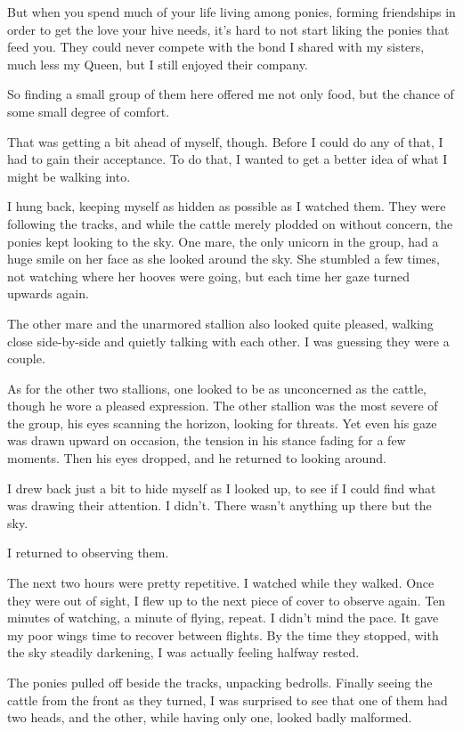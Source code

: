 But when you spend much of your life living among ponies, forming friendships in order to get the love your hive needs, it’s hard to not start liking the ponies that feed you. They could never compete with the bond I shared with my sisters, much less my Queen, but I still enjoyed their company.

So finding a small group of them here offered me not only food, but the chance of some small degree of comfort.

That was getting a bit ahead of myself, though. Before I could do any of that, I had to gain their acceptance. To do that, I wanted to get a better idea of what I might be walking into.

I hung back, keeping myself as hidden as possible as I watched them. They were following the tracks, and while the cattle merely plodded on without concern, the ponies kept looking to the sky. One mare, the only unicorn in the group, had a huge smile on her face as she looked around the sky. She stumbled a few times, not watching where her hooves were going, but each time her gaze turned upwards again.

The other mare and the unarmored stallion also looked quite pleased, walking close side-by-side and quietly talking with each other. I was guessing they were a couple.

As for the other two stallions, one looked to be as unconcerned as the cattle, though he wore a pleased expression. The other stallion was the most severe of the group, his eyes scanning the horizon, looking for threats. Yet even his gaze was drawn upward on occasion, the tension in his stance fading for a few moments. Then his eyes dropped, and he returned to looking around.

I drew back just a bit to hide myself as I looked up, to see if I could find what was drawing their attention. I didn’t. There wasn’t anything up there but the sky.

I returned to observing them.

The next two hours were pretty repetitive. I watched while they walked. Once they were out of sight, I flew up to the next piece of cover to observe again. Ten minutes of watching, a minute of flying, repeat. I didn’t mind the pace. It gave my poor wings time to recover between flights. By the time they stopped, with the sky steadily darkening, I was actually feeling halfway rested.

The ponies pulled off beside the tracks, unpacking bedrolls. Finally seeing the cattle from the front as they turned, I was surprised to see that one of them had two heads, and the other, while having only one, looked badly malformed.

